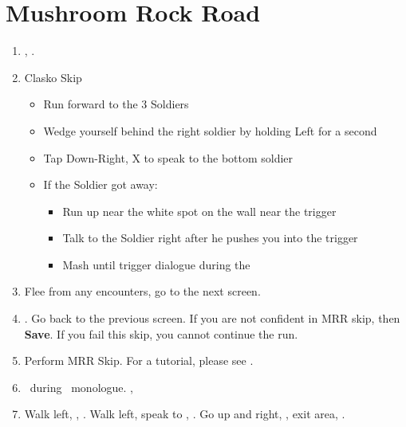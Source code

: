\chapter{Mushroom Rock Road}

\begin{enumerate}
    \item \sd, \cs.
    \item Clasko Skip
    \begin{itemize}
        \item Run forward to the 3 Soldiers
        \item Wedge yourself behind the right soldier by holding Left for a second
        \item Tap Down-Right, X to speak to the bottom soldier
        \item If the Soldier got away:
        \begin{itemize}
            \item Run up near the white spot on the wall near the trigger
            \item Talk to the Soldier right after he pushes you into the trigger
            \item Mash until trigger dialogue during the \cs
        \end{itemize}
    \end{itemize}
    \item Flee from any encounters, go to the next screen.
    \item \save. Go back to the previous screen. If you are not confident in MRR skip, then \textbf{Save}. If you fail this skip, you cannot continue the run.
    \item Perform MRR Skip. For a tutorial, please see .
    \item \sd\ during \tidus\ monologue. \cs[1:00], \sd
    \item Walk left, \save, \sd. Walk left, speak to \auron, \sd. Go up and right, \sd, exit area, \sd.
\end{enumerate}
\wincb\losscb\bothcb
